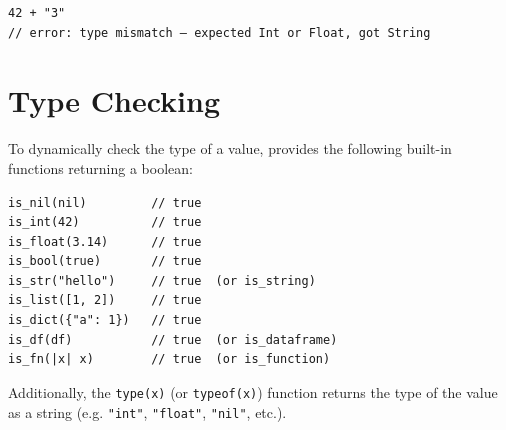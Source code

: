 \begin{lstlisting}
42 + "3"
// error: type mismatch — expected Int or Float, got String
\end{lstlisting}

\section{Type Checking}

To dynamically check the type of a value, \hayashi{} provides the following built-in functions returning a boolean:

\begin{lstlisting}
is_nil(nil)         // true
is_int(42)          // true
is_float(3.14)      // true
is_bool(true)       // true
is_str("hello")     // true  (or is_string)
is_list([1, 2])     // true
is_dict({"a": 1})   // true
is_df(df)           // true  (or is_dataframe)
is_fn(|x| x)        // true  (or is_function)
\end{lstlisting}

Additionally, the \lstinline{type(x)} (or \lstinline{typeof(x)}) function returns the type of the value as a string (e.g. \lstinline{"int"}, \lstinline{"float"}, \lstinline{"nil"}, etc.).
